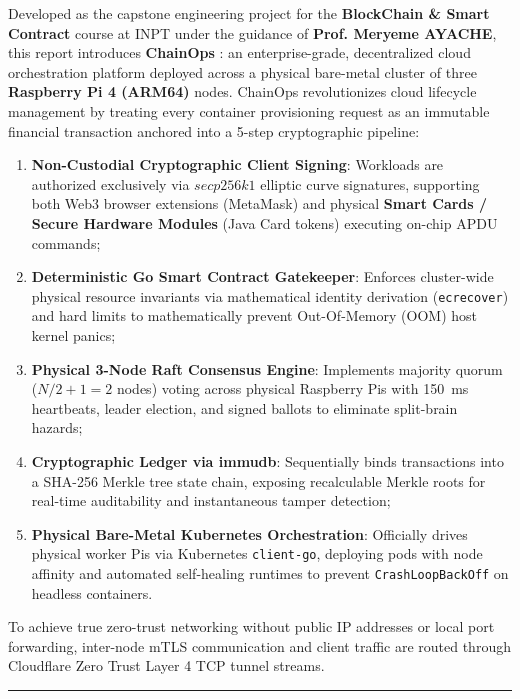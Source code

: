 \documentclass[a4paper,12pt]{article}
\begin{document}
Developed as the capstone engineering project for the \textbf{BlockChain \& Smart Contract} course at INPT under the guidance of \textbf{Prof. Meryeme AYACHE}, this report introduces \textbf{ChainOps} : an enterprise-grade, decentralized cloud orchestration platform deployed across a physical bare-metal cluster of three \textbf{Raspberry Pi 4 (ARM64)} nodes. ChainOps revolutionizes cloud lifecycle management by treating every container provisioning request as an immutable financial transaction anchored into a 5-step cryptographic pipeline:

\begin{enumerate}[leftmargin=1.2cm]
    \item \textbf{Non-Custodial Cryptographic Client Signing}: Workloads are authorized exclusively via $secp256k1$ elliptic curve signatures, supporting both Web3 browser extensions (MetaMask) and physical \textbf{Smart Cards / Secure Hardware Modules} (Java Card tokens) executing on-chip APDU commands;
    \item \textbf{Deterministic Go Smart Contract Gatekeeper}: Enforces cluster-wide physical resource invariants via mathematical identity derivation (\texttt{ecrecover}) and hard limits to mathematically prevent Out-Of-Memory (OOM) host kernel panics;
    \item \textbf{Physical 3-Node Raft Consensus Engine}: Implements majority quorum ($N/2 + 1 = 2$ nodes) voting across physical Raspberry Pis with 150~ms heartbeats, leader election, and signed ballots to eliminate split-brain hazards;
    \item \textbf{Cryptographic Ledger via immudb}: Sequentially binds transactions into a SHA-256 Merkle tree state chain, exposing recalculable Merkle roots for real-time auditability and instantaneous tamper detection;
    \item \textbf{Physical Bare-Metal Kubernetes Orchestration}: Officially drives physical worker Pis via Kubernetes \texttt{client-go}, deploying pods with node affinity and automated self-healing runtimes to prevent \texttt{CrashLoopBackOff} on headless containers.
\end{enumerate}

To achieve true zero-trust networking without public IP addresses or local port forwarding, inter-node mTLS communication and client traffic are routed through Cloudflare Zero Trust Layer 4 TCP tunnel streams.

\vspace{0.4cm}
\noindent\rule{\textwidth}{0.4pt}
\vspace{0.2cm}
\end{document}
